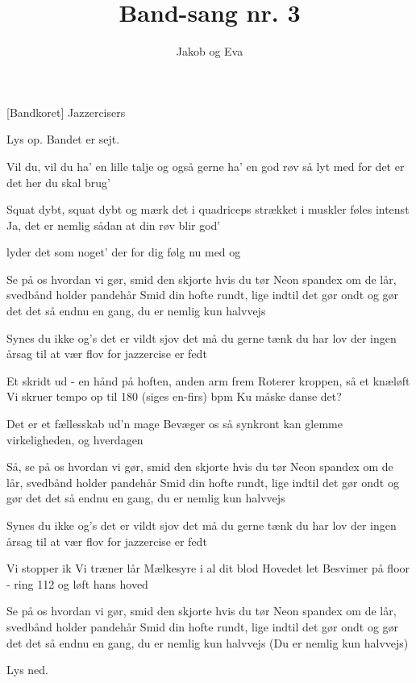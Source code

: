 \documentclass{ucph-revy}
\author{Jakob og Eva}
\title{Band-sang nr. 3}
\begin{document}
\maketitle
	\begin{roles}
		[Bandkoret] Jazzercisers
	\end{roles}



\begin{song}

\scene Lys op. 
\scene Bandet er sejt. %



 Vil du, vil du ha’ en lille talje
og også gerne ha’ en god røv
så lyt med for det er det her du skal brug’

Squat dybt, squat dybt og mærk det i quadriceps
strækket i muskler føles intenst
Ja, det er nemlig sådan at din røv blir god’

lyder det som noget’ der for dig
følg nu med og

Se på os hvordan vi gør, smid den skjorte hvis du tør
Neon spandex om de lår, svedbånd holder pandehår
Smid din hofte rundt, lige indtil det gør ondt
og gør det det så endnu en gang, du er nemlig kun halvvejs

Synes du ikke og’s det er vildt sjov  
det må du gerne tænk du har lov
der ingen årsag til at vær flov
for jazzercise er fedt

Et skridt ud - en hånd på hoften, anden arm frem
Roterer kroppen, så et knæløft
Vi skruer tempo op til 180 (siges en-firs) bpm
\scene Ku måske danse det?

Det er et fællesskab ud’n mage
Bevæger os så synkront
kan glemme virkeligheden, og hverdagen

Så, se på os hvordan vi gør, smid den skjorte hvis du tør
Neon spandex om de lår, svedbånd holder pandehår
Smid din hofte rundt, lige indtil det gør ondt
og gør det det så endnu en gang, du er nemlig kun halvvejs

Synes du ikke og’s det er vildt sjov  
det må du gerne tænk du har lov
der ingen årsag til at vær flov
for jazzercise er fedt

Vi stopper ik
Vi træner lår
Mælkesyre i al dit blod
Hovedet let
Besvimer på floor - ring 112 og løft hans hoved

Se på os hvordan vi gør, smid den skjorte hvis du tør
Neon spandex om de lår, svedbånd holder pandehår
Smid din hofte rundt, lige indtil det gør ondt
og gør det det så endnu en gang, du er nemlig kun halvvejs
(Du er nemlig kun halvvejs)

\scene Lys ned. %

\end{song}
\end{document}
